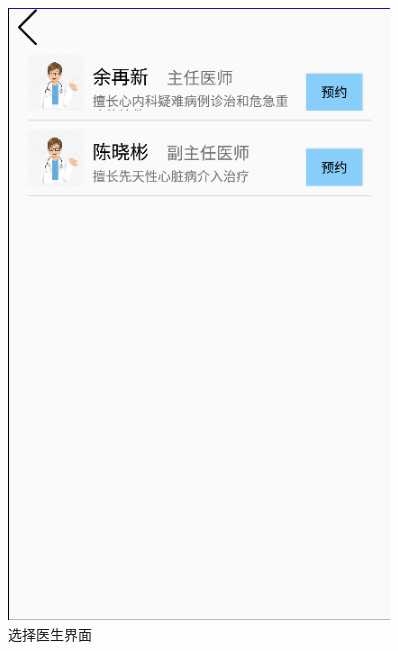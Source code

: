\documentclass[UTF8,12pt]{article}
\begin{document}
\begin{figure}[htbp]
    \begin{minipage}[t]{0.45\textwidth}
        \centering
        \includegraphics[width=0.9\textwidth]{imgs/22.png}
        \caption{选择医生界面}
    \end{minipage}%
    \begin{minipage}[t]{0.45\textwidth}
        \centering

\end{minipage}
\end{figure}
\end{document}
